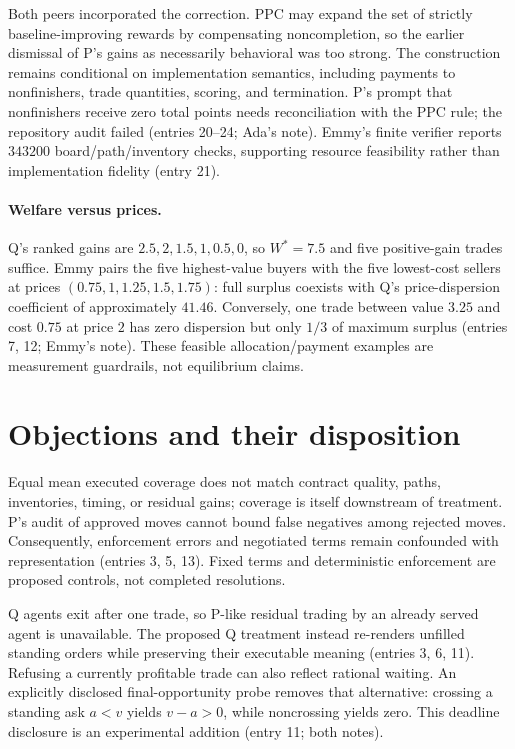 \documentclass{article}
\begin{document}
Both peers incorporated the correction. PPC may expand the set of strictly baseline-improving rewards by
compensating noncompletion, so the earlier dismissal of P's gains as necessarily behavioral was too strong.
The construction remains conditional on implementation semantics, including payments to nonfinishers, trade
quantities, scoring, and termination. P's prompt that nonfinishers receive zero total points needs
reconciliation with the PPC rule; the repository audit failed (entries 20--24; Ada's note). Emmy's finite
verifier reports \(343200\) board/path/inventory checks, supporting resource feasibility rather than
implementation fidelity (entry 21).

\paragraph{Welfare versus prices.}
Q's ranked gains are \(2.5,2,1.5,1,0.5,0\), so \(W^*=7.5\) and five positive-gain trades suffice. Emmy pairs
the five highest-value buyers with the five lowest-cost sellers at prices \((0.75,1,1.25,1.5,1.75)\): full
surplus coexists with Q's price-dispersion coefficient of approximately \(41.46\). Conversely, one trade
between value \(3.25\) and cost \(0.75\) at price \(2\) has zero dispersion but only \(1/3\) of maximum
surplus (entries 7, 12; Emmy's note). These feasible allocation/payment examples are measurement guardrails,
not equilibrium claims.

\section*{Objections and their disposition}
Equal mean executed coverage does not match contract quality, paths, inventories, timing, or residual gains;
coverage is itself downstream of treatment. P's audit of approved moves cannot bound false negatives among
rejected moves. Consequently, enforcement errors and negotiated terms remain confounded with representation
(entries 3, 5, 13). Fixed terms and deterministic enforcement are proposed controls, not completed
resolutions.

Q agents exit after one trade, so P-like residual trading by an already served agent is unavailable. The
proposed Q treatment instead re-renders unfilled standing orders while preserving their executable meaning
(entries 3, 6, 11). Refusing a currently profitable trade can also reflect rational waiting. An explicitly
disclosed final-opportunity probe removes that alternative: crossing a standing ask \(a<v\) yields \(v-a>0\),
while noncrossing yields zero. This deadline disclosure is an experimental addition (entry 11; both notes).
\end{document}
